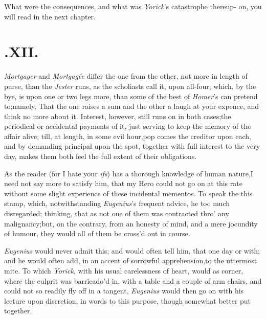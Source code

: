 \documentclass{article}
\begin{document}
What were the consequences, and\break 
what was \textit{Yorick}’s catastrophe thereup-\break
on, you will read in the next chapter.


\null
\section{.\enspace XII.}

 \textit{Mortgager} and \textit{Mortgagée}\break 
differ the one from the other, not more in length
of purse, than the \textit{Jester} 
runs, as the
scholiasts call it, upon all-four; which, by the bye, is upon one
or two legs more, than some of the best of \textit{Homer}’s can
pretend to;\tsk namely, That the one raises a sum and the other
a laugh at your expence, and think no more about it. Interest,
however, still runs on in both cases;\tsk the periodical or
accidental payments of it, just serving to keep the memory of the
affair alive; till, at length, in some evil hour,\tsk pop comes the
creditor upon each, and by demanding principal upon the spot,
together with full interest to the very day, makes them both feel
the full extent of their obligations.

As the reader (for I hate your \textit{ifs}) has a thorough
knowledge of human nature,\break I need not say more to satisfy him, that my
Hero could not go on at this rate without some
slight experience of these incidental mementos. To speak the\break
{}
this stamp, which, notwithstanding \textit{Eu\-genius}’s
frequent advice, he too much disregarded; thinking, that as not one
of them was contracted thro’ any malignancy;\tsk but, on
the contrary, from an honesty of mind, and a mere jocundity of
humour, they would all of them be cross’d out in course.

\textit{Eugenius} would never admit this; and would often tell
him, that one day or 
with; and he would often add, in an accent of sorrowful apprehension,\tsk to the
uttermost mite. To which \textit{Yorick}, with\break
his usual carelessness of heart, would as\break
{} 
corner, where the culprit was barrica\-do’d in, with a table
and a couple of arm chairs, and could not so readily fly off in a tangent,\tsk
\textit{Eugenius} would then go on with his lecture upon
discretion, in words to
this purpose, though somewhat better put together.
\end{document}
